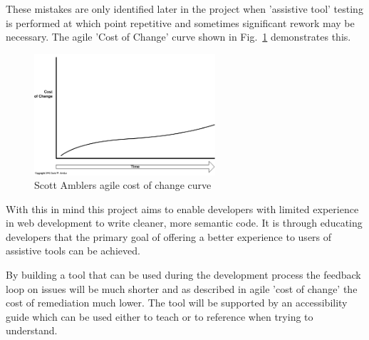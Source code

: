 These mistakes are only identified later in the project when
'assistive tool' testing is performed at which point repetitive and sometimes
significant rework may be necessary. The agile 'Cost of Change' \citep{CostOfChange} curve
shown in Fig.~\ref{fig:costOfChange} demonstrates this.

\begin{figure}[H]
\centering
\includegraphics[width=0.6\textwidth]{figures/costOfChange}
\captionsetup{justification=centering}
\caption{Scott Amblers agile cost of change curve
\label{fig:costOfChange}}
\end{figure}

With this in mind this project aims to enable developers with limited
experience in web development to write cleaner, more semantic code. It is
through educating developers that the primary goal of offering a better
experience to users of assistive tools can be achieved.


 By building a tool that can be used during
 the development process the feedback loop on issues will be much
 shorter and as described in agile 'cost of change' the cost of remediation
 much lower. The tool will be supported by an accessibility guide which can
 be used either to teach or to reference when trying to understand.

